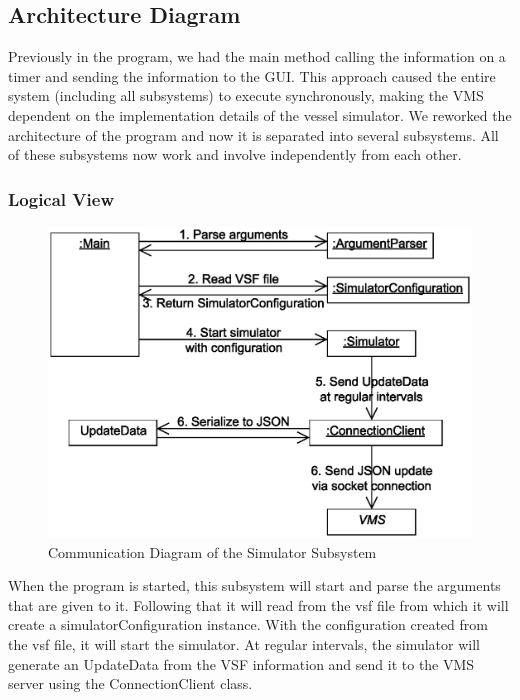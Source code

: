 \documentclass{article}
\begin{document}
\subsection{Architecture Diagram} %
Previously in the program, we had the main method calling the information on a timer and sending the information to the GUI. 
This approach caused the entire system (including all subsystems) to execute synchronously, making the VMS dependent on the implementation details of the vessel simulator.
We reworked the architecture of the program and now it is separated into several subsystems.
All of these subsystems now work and involve independently from each other.
\subsubsection{Logical View} %
\begin{figure}[!htb]
\caption{Communication Diagram of the Simulator Subsystem}
\centering
\includegraphics[scale=0.7]{diagrams/simulator-communication-diagram.eps}
\end{figure}
When the program is started, this subsystem will start and parse the arguments that are given to it. Following that it will read from the vsf file from which it will create a simulatorConfiguration instance. With the configuration created from the vsf file, it will start the simulator. At regular intervals, the simulator will generate an UpdateData from the VSF information and send it to the VMS server using the ConnectionClient class.
\end{document}
